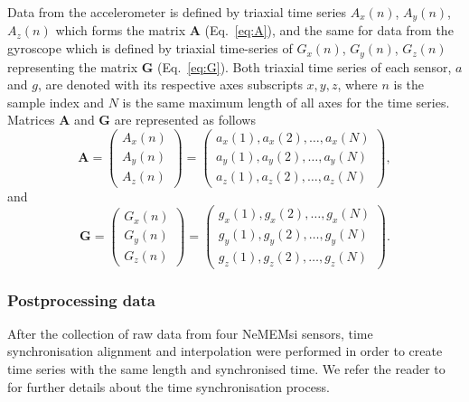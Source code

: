 \documentclass[fleqn,10pt]{wlscirep}
\begin{document}
Data from the accelerometer is defined by triaxial time series 
$A_x(n)$, $A_y(n)$, $A_z(n)$ which forms the matrix $\boldsymbol{A}$ 
(Eq.~\ref{eq:A}), and the same for data from the gyroscope 
which is defined by triaxial time-series of $G_x(n)$, $G_y(n)$, $G_z(n)$ 
representing the matrix $\boldsymbol{G}$ (Eq.~\ref{eq:G}).
Both triaxial time series of each sensor, $a$ and $g$, are denoted with 
its respective axes subscripts $x,y,z$, where $n$ is the sample index 
and $N$ is the same maximum length of all axes for the time series.
Matrices  $\boldsymbol{A}$ and $\boldsymbol{G}$ are represented as follows
\begin{equation}\label{eq:A}
\boldsymbol{A} =
\begin{pmatrix}
  A_x(n) \\
  A_y(n) \\
  A_z(n)
\end{pmatrix}
=
\begin{pmatrix}
 a_x(1),a_x(2),\dots,a_x(N) \\
 a_y(1),a_y(2),\dots,a_y(N) \\
 a_z(1),a_z(2),\dots,a_z(N) 
\end{pmatrix},
\end{equation}
and 
\begin{equation}\label{eq:G}
\boldsymbol{G} =
\begin{pmatrix}
 G_x(n) \\
 G_y(n) \\
 G_z(n)
\end{pmatrix}
=
\begin{pmatrix}
 g_x(1),g_x(2),\dots,g_x(N) \\
 g_y(1),g_y(2),\dots,g_y(N) \\
 g_z(1),g_z(2),\dots,g_z(N) 
\end{pmatrix}.
\end{equation}




\subsubsection*{Postprocessing data}
After the collection of raw data from four NeMEMsi sensors,
time synchronisation alignment and interpolation were performed 
in order to create time series with the same length and synchronised time.
We refer the reader to \cite{Comotti2014} for further
details about the time synchronisation process.
\end{document}
